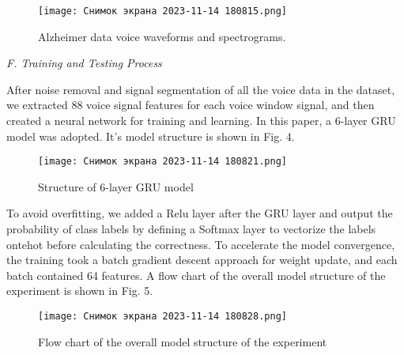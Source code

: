 \begin{figure}[!h]
\centering
\texttt{[image: Снимок экрана 2023-11-14 180815.png]}
\caption{Alzheimer data voice waveforms and spectrograms.}
\end{figure}

\begin{spacing}{1.25}
\textit{F. Training and Testing Process}   
\end{spacing}

\par 
After noise removal and signal segmentation of all the
voice data in the dataset, we extracted 88 voice signal
features for each voice window signal, and then created
a neural network for training and learning. In this paper,
a 6-layer GRU model was adopted. It’s model structure
is shown in Fig. 4.

\begin{figure}[!h]
\centering
\texttt{[image: Снимок экрана 2023-11-14 180821.png]}
\caption{Structure of 6-layer GRU model}
\end{figure}

\par
To avoid overfitting, we added a Relu layer after the
GRU layer and output the probability of class labels by
defining a Softmax layer to vectorize the labels ontehot before calculating the correctness. To accelerate the
model convergence, the training took a batch gradient
descent approach for weight update, and each batch
contained 64 features. A flow chart of the overall model
structure of the experiment is shown in Fig. 5.

\begin{figure}[!h]
\centering
\texttt{[image: Снимок экрана 2023-11-14 180828.png]}
\caption{Flow chart of the overall model structure of the experiment}
\end{figure}


